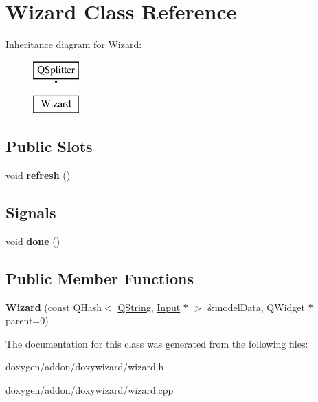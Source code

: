 \hypertarget{class_wizard}{}\section{Wizard Class Reference}
\label{class_wizard}
Inheritance diagram for Wizard\+:\begin{figure}[H]
\begin{center}
\leavevmode
\includegraphics[height=2.000000cm]{class_wizard}
\end{center}
\end{figure}
\subsection*{Public Slots}
\begin{DoxyCompactItemize}
\item 
\mbox{\label{class_wizard_a86f0229c11eb822aed9a927dbbbc8bd8}} 
void {\bfseries refresh} ()
\end{DoxyCompactItemize}
\subsection*{Signals}
\begin{DoxyCompactItemize}
\item 
\mbox{\label{class_wizard_a5c87bd4bb38d19171ab2fbde096cb78b}} 
void {\bfseries done} ()
\end{DoxyCompactItemize}
\subsection*{Public Member Functions}
\begin{DoxyCompactItemize}
\item 
\mbox{\label{class_wizard_a76ce3a0acb56d30f695b7183941563bc}} 
{\bfseries Wizard} (const Q\+Hash$<$ \mbox{\hyperlink{class_q_string}{Q\+String}}, \mbox{\hyperlink{class_input}{Input}} $\ast$ $>$ \&model\+Data, Q\+Widget $\ast$parent=0)
\end{DoxyCompactItemize}


The documentation for this class was generated from the following files\+:\begin{DoxyCompactItemize}
\item 
doxygen/addon/doxywizard/wizard.\+h\item 
doxygen/addon/doxywizard/wizard.\+cpp\end{DoxyCompactItemize}
